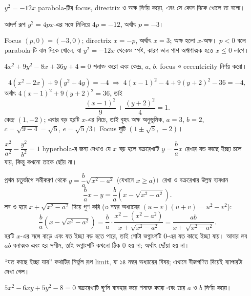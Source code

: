 \documentclass[11pt]{article}
\begin{document}
 $y^{2} = -12x$ parabola-টির focus, directrix ও অক্ষ নির্ণয় করো, এবং
সে কোন দিকে খোলে তা বলো।

\begin{sol}
আদর্শ রূপ $y^{2} = 4px$-এর সঙ্গে মিলিয়ে $4p = -12$, অর্থাৎ $p = -3$।

Focus $(p, 0) = (-3, 0)$; directrix $x = -p$, অর্থাৎ $x = 3$; অক্ষ হলো
$x$-অক্ষ। $p < 0$ বলে parabola-টি বাম দিকে খোলে, যা $y^{2} = -12x$ থেকেও স্পষ্ট,
কারণ ডান পাশ অঋণাত্মক হতে $x \leq 0$ লাগে।
\end{sol}

 $4x^{2} + 9y^{2} - 8x + 36y + 4 = 0$ শনাক্ত করো এবং কেন্দ্র, $a$, $b$,
focus ও eccentricity নির্ণয় করো।

\begin{sol}
\[
  4(x^{2}-2x) + 9(y^{2}+4y) = -4
  \;\Longrightarrow\; 4(x-1)^{2} - 4 + 9(y+2)^{2} - 36 = -4 ,
\]
অর্থাৎ $4(x-1)^{2} + 9(y+2)^{2} = 36$, তাই
\[
  \frac{(x-1)^{2}}{9} + \frac{(y+2)^{2}}{4} = 1 .
\]
কেন্দ্র $(1,-2)$; এবার বড় হরটি $x$-এর নিচে, তাই বৃহৎ অক্ষ অনুভূমিক, $a = 3$,
$b = 2$, $c = \sqrt{9-4} = \sqrt{5}$, $e = \sqrt{5}/3$। Focus দুটি
$\left( 1 \pm \sqrt{5},\, -2 \right)$।
\end{sol}

 $\dfrac{x^{2}}{a^{2}} - \dfrac{y^{2}}{b^{2}} = 1$ hyperbola-র জন্য
দেখাও যে $x$ বড় হলে বক্ররেখাটি $y = \dfrac{b}{a}x$ রেখার যত কাছে ইচ্ছা চলে যায়,
কিন্তু কখনো তাকে ছোঁয় না।

\begin{sol}
প্রথম চতুর্ভাগে সমীকরণ থেকে
$y = \dfrac{b}{a}\sqrt{x^{2}-a^{2}}$ (যেখানে $x \geq a$)। রেখা ও বক্ররেখার
উল্লম্ব ব্যবধান
\[
  \frac{b}{a}x - y = \frac{b}{a}\left( x - \sqrt{x^{2}-a^{2}} \right) .
\]
লব ও হরে $x + \sqrt{x^{2}-a^{2}}$ দিয়ে গুণ করি (৩ নম্বর অধ্যায়ের
$(u-v)(u+v) = u^{2}-v^{2}$):
\[
  \frac{b}{a}\left( x - \sqrt{x^{2}-a^{2}} \right)
  = \frac{b}{a} \cdot \frac{x^{2} - (x^{2}-a^{2})}{x + \sqrt{x^{2}-a^{2}}}
  = \frac{ab}{x + \sqrt{x^{2}-a^{2}}} .
\]
হরটি $x$-এর সঙ্গে বাড়ে এবং যত ইচ্ছা বড় হতে পারে, তাই গোটা ভগ্নাংশটি $0$-এর যত
কাছে ইচ্ছা যায়। আবার লব $ab$ ধনাত্মক এবং হর সসীম, তাই ভগ্নাংশটি কখনো ঠিক $0$
হয় না; অর্থাৎ ছোঁয়া হয় না।

``যত কাছে ইচ্ছা যায়'' কথাটির নির্ভুল রূপ limit, যা ১৪ নম্বর অধ্যায়ের বিষয়;
এখানে বীজগণিত দিয়েই ব্যাপারটা দেখা গেল।
\end{sol}

 $5x^{2} - 6xy + 5y^{2} - 8 = 0$ বক্ররেখাটি ঘূর্ণন ব্যবহার করে শনাক্ত
করো এবং তার $a$ ও $b$ নির্ণয় করো।
\end{document}
